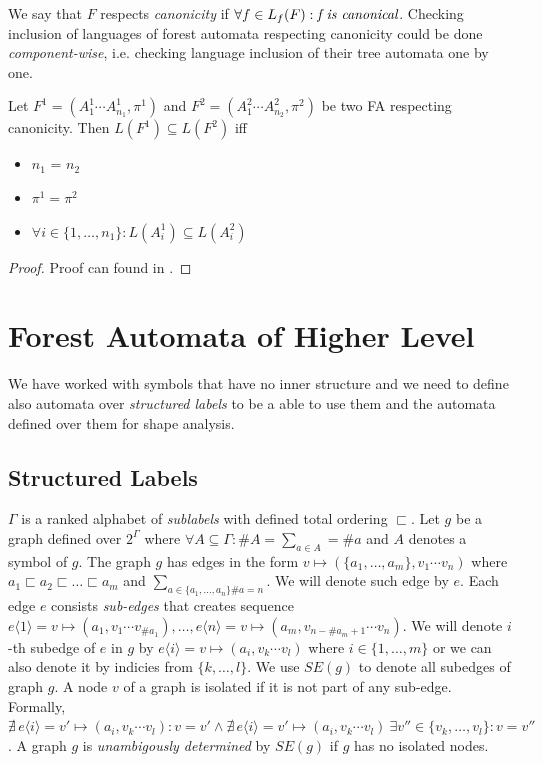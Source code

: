 We say that $F$ respects \emph{canonicity} if $\forall f \in L_f(F): \emph{f is canonical}$.
Checking inclusion of languages of forest automata respecting canonicity could be done \emph{component-wise},
i.e. checking language inclusion of their tree automata one by one.

\begin{lemma}
	Let $F^1 = (A_1^1\cdots A_{n_1}^1, \pi^1)$ and $F^2 = (A_1^2\cdots A_{n_2}^2, \pi^2)$
	be two FA respecting canonicity.
	Then $L(F^1) \subseteq L(F^2)$ iff
	\begin{itemize}
			\item $n_1$ = $n_2$
			\item $\pi^1 = \pi^2$
			\item $\forall i \in \{1,\ldots,n_1\}: L(A_i^1) \subseteq L(A_i^2)$
	\end{itemize}
\end{lemma}
\begin{proof}
	Proof can found in \cite{cav11tr}.
\end{proof}

\section{Forest Automata of Higher Level}
\label{sec:fah}

We have worked with symbols that have no inner structure and
we need to define also automata over \emph{structured labels} to be a
able to use them and the automata defined over them for shape analysis.

\subsection{Structured Labels}

$\Gamma$ is a ranked alphabet of \emph{sublabels} with defined total ordering $\sqsubset$.
Let $g$ be a graph defined over $2^\Gamma$ where $\forall A \subseteq \Gamma: \#A = \sum_{a\in A} = \#a$
and $A$ denotes a symbol of $g$.
The graph $g$ has edges in the form $v \mapsto (\{a_1,\ldots,a_m\},v_1 \cdots v_n)$ where
$a_1 \sqsubset a_2 \sqsubset \ldots \sqsubset a_m$ and $\sum_{a \in \{a_1,\ldots,a_n\} \# a = n}$.
We will denote such edge by $e$.
Each edge $e$ consists \emph{sub-edges} that creates sequence $e\langle 1\rangle = v \mapsto (a_1,v_1 \cdots v_{\#a_1}),\ldots, e\langle n\rangle= v \mapsto (a_m,v_{n-\#a_m+1} \cdots v_n)$.
We will denote $i$-th subedge of $e$ in $g$ by $e\langle i\rangle = v \mapsto (a_i,v_k \cdots v_l)$ where $i \in \{1,\ldots,m\}$ or
we can also denote it by indicies from $\{k,\ldots,l\}$.
We use $SE(g)$ to denote all subedges of graph $g$.
A node $v$ of a graph is isolated if it is not part of any sub-edge.
Formally, $\nexists\, e\langle i\rangle = v' \mapsto (a_i,v_k \cdots v_l): v = v' \wedge \nexists\, e\langle i\rangle = v' \mapsto (a_i,v_k \cdots v_l)\ \exists v'' \in \{v_k,\ldots, v_l\}: v = v''$.
A graph $g$ is \emph{unambigously determined} by $SE(g)$ if $g$ has no isolated nodes.

